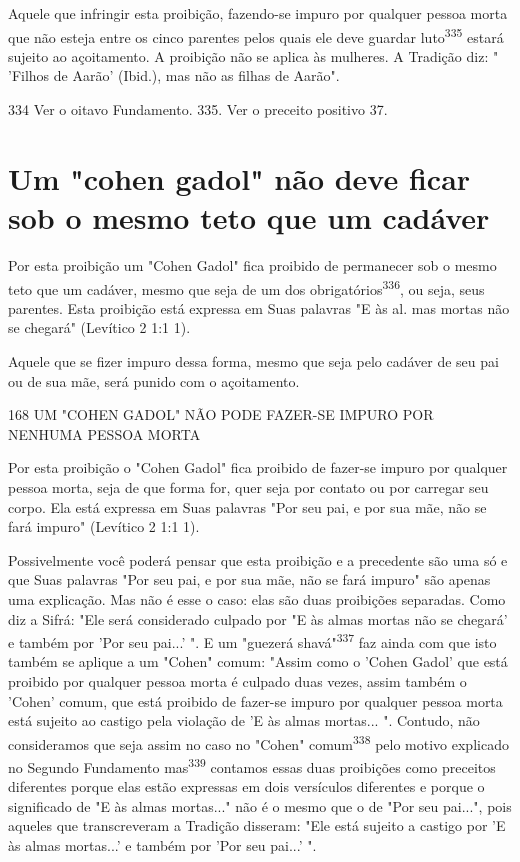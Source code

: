 \begin{itemize}
\begin{enumrate}
\begin{itemize}
\begin{itemize}
\begin{itemize}
Aquele que infringir esta proibição, fazendo-se impuro por qualquer
pessoa morta que não esteja entre os cinco parentes pelos quais ele deve
guar­dar luto\textsuperscript{335} estará sujeito ao açoitamento. A
proibição não se aplica às mulhe­res. A Tradição diz: " 'Filhos de
Aarão' (Ibid.), mas não as filhas de Aarão".

334 Ver o oitavo Fundamento. 335. Ver o preceito positivo 37.


\section{Um "cohen gadol" não deve ficar sob o mesmo teto que um cadáver}

Por esta proibição um "Cohen Gadol" fica proibido de permanecer sob o
mesmo teto que um cadáver, mesmo que seja de um dos
obrigatórios\textsuperscript{336}, ou seja, seus parentes. Esta
proibição está expressa em Suas palavras "E às al­. mas mortas não se
chegará" (Levítico 2 1:1 1).

Aquele que se fizer impuro dessa forma, mesmo que seja pelo cadá­ver de
seu pai ou de sua mãe, será punido com o açoitamento.

168 UM "COHEN GADOL" NÃO PODE FAZER-SE IMPURO POR NENHUMA PESSOA MORTA

Por esta proibição o "Cohen Gadol" fica proibido de fazer-se impu­ro por
qualquer pessoa morta, seja de que forma for, quer seja por contato ou
por carregar seu corpo. Ela está expressa em Suas palavras "Por seu pai,
e por sua mãe, não se fará impuro" (Levítico 2 1:1 1).

Possivelmente você poderá pensar que esta proibição e a preceden­te são
uma só e que Suas palavras "Por seu pai, e por sua mãe, não se fará
impu­ro" são apenas uma explicação. Mas não é esse o caso: elas são duas
proibições separadas. Como diz a Sifrá: "Ele será considerado culpado
por "E às almas mor­tas não se chegará' e também por 'Por seu pai...' ".
E um "guezerá shavá"\textsuperscript{337} faz ainda com que isto também
se aplique a um "Cohen" comum: "Assim co­mo o 'Cohen Gadol' que está
proibido por qualquer pessoa morta é culpado duas vezes, assim também o
'Cohen' comum, que está proibido de fazer-se im­puro por qualquer pessoa
morta está sujeito ao castigo pela violação de 'E às almas mortas... ".
Contudo, não consideramos que seja assim no caso no "Co­hen"
comum\textsuperscript{338} pelo motivo explicado no Segundo Fundamento
mas\textsuperscript{339} con­tamos essas duas proibições como preceitos
diferentes porque elas estão ex­pressas em dois versículos diferentes e
porque o significado de "E às almas mor­tas..." não é o mesmo que o de
"Por seu pai...", pois aqueles que transcreve­ram a Tradição disseram:
"Ele está sujeito a castigo por 'E às almas mortas...' e também por 'Por
seu pai...' ".


\end{itemize}
\end{itemize}
\end{itemize}
\end{enumrate}
\end{itemize}
